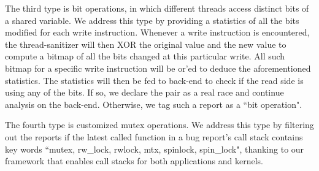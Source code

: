 
The third type is bit operations, in which different threads access distinct
bits of a shared variable. We address this type by providing a statistics of all
the bits modified for each write instruction. Whenever a write instruction is
encountered, the thread-sanitizer will then XOR the original value and the new
value to compute a bitmap of all the bits changed at this particular write. All
such bitmap for a specific write instruction will be or'ed to deduce the
aforementioned statistics. The statistics will then be fed to back-end to check
if the read side is using any of the bits. If so, we declare the pair as a real
race and continue analysis on the back-end. Otherwise, we tag such a report as a
``bit operation".



The fourth type is customized mutex operations. We address this type by 
filtering
out the reports if the latest called function in a bug report's call stack
contains key words ``mutex, rw\_lock, rwlock, mtx, spinlock, spin\_lock",
thanking to our \xxx framework that enables call stacks for both applications
and kernels. 



